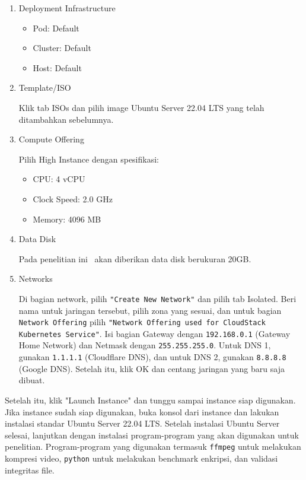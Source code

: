 \begin{enumerate}
    \item Deployment Infrastructure
    \begin{itemize}
        \item Pod: Default
        \item Cluster: Default
        \item Host: Default
    \end{itemize}

    \item Template/ISO
    
    Klik tab ISOs dan pilih image Ubuntu Server 22.04 LTS yang telah ditambahkan sebelumnya.

    \item Compute Offering
    
    Pilih High Instance dengan spesifikasi:
    \begin{itemize}
        \item CPU: 4 vCPU
        \item Clock Speed: 2.0 GHz
        \item Memory: 4096 MB
    \end{itemize}

    \item Data Disk
    
    Pada penelitian ini \vm\ akan diberikan data disk berukuran 20GB.

    \item Networks
    
    Di bagian network, pilih \texttt{"Create New Network"} dan pilih tab Isolated. Beri nama untuk jaringan tersebut, pilih zona yang sesuai, dan untuk bagian \texttt{Network Offering} pilih \texttt{"Network Offering used for CloudStack Kubernetes Service"}. Isi bagian Gateway dengan \texttt{192.168.0.1} (Gateway Home Network) dan Netmask dengan \texttt{255.255.255.0}. Untuk DNS 1, gunakan \texttt{1.1.1.1} (Cloudflare DNS), dan untuk DNS 2, gunakan \texttt{8.8.8.8} (Google DNS). Setelah itu, klik OK dan centang jaringan yang baru saja dibuat.
\end{enumerate}

Setelah itu, klik "Launch Instance" dan tunggu sampai instance siap digunakan. Jika instance sudah siap digunakan, buka konsol dari instance dan lakukan instalasi standar Ubuntu Server 22.04 LTS. Setelah instalasi Ubuntu Server selesai, lanjutkan dengan instalasi program-program yang akan digunakan untuk penelitian. Program-program yang digunakan termasuk \texttt{ffmpeg} untuk melakukan kompresi video, \texttt{python} untuk melakukan benchmark enkripsi, dan validasi integritas file.

